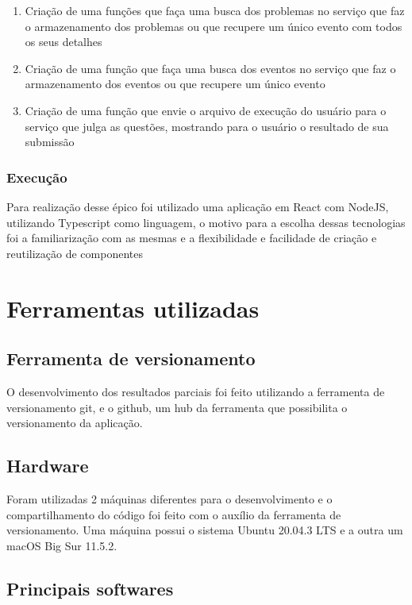 \begin{enumerate}
          \begin{enumerate}
              \item Criação de uma funções que faça uma busca dos problemas no serviço que faz o armazenamento dos problemas ou que recupere um único evento com todos os seus detalhes
              \item Criação de uma função que faça uma busca dos eventos no serviço que faz o armazenamento dos eventos ou que recupere um único evento
              \item Criação de uma função que envie o arquivo de execução do usuário para o serviço que julga as questões, mostrando para o usuário o resultado de sua submissão
          \end{enumerate}
\end{enumerate}

\subsubsection{Execução}

Para realização desse épico foi utilizado uma aplicação em React com NodeJS, utilizando Typescript como linguagem, o motivo para a escolha dessas tecnologias foi a familiarização com as mesmas e a flexibilidade e facilidade de criação e reutilização de componentes

\section{Ferramentas utilizadas}

\subsection{Ferramenta de versionamento}

O desenvolvimento dos resultados parciais foi feito utilizando a ferramenta de versionamento git, e o github, um hub da ferramenta que possibilita o versionamento da aplicação.

\subsection{Hardware}

Foram utilizadas 2 máquinas diferentes para o desenvolvimento e o compartilhamento do código foi feito com o auxílio da ferramenta de versionamento. Uma máquina possui o sistema Ubuntu 20.04.3 LTS e a outra um macOS Big Sur 11.5.2.

\subsection{Principais softwares}

